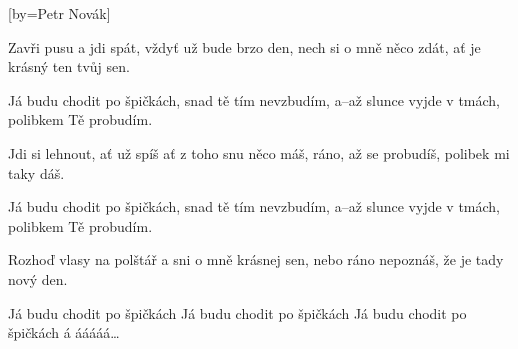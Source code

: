 [by={Petr Novák}]

\beginverse{}
Zavři pusu a jdi spát, vždyť už bude brzo den,
nech si o mně něco zdát, ať je krásný ten tvůj sen.
\endverse{}

\beginchorus{}
Já budu chodit po špičkách, snad tě tím nevzbudím,
a--až slunce vyjde v tmách, polibkem Tě probudím.
\endchorus{}

\beginverse{}
Jdi si lehnout, ať už spíš ať z toho snu něco máš,
ráno, až se probudíš, polibek mi taky dáš.
\endverse{}

\beginchorus{}
Já budu chodit po špičkách, snad tě tím nevzbudím,
a--až slunce vyjde v tmách, polibkem Tě probudím.
\endchorus{}

\beginverse{}
Rozhoď vlasy na polštář a sni o mně krásnej sen,
nebo ráno nepoznáš, že je tady nový den.
\endverse{}

\beginchorus{}
Já budu chodit po špičkách
Já budu chodit po špičkách
Já budu chodit po špičkách
á ááááá\ldots{}  
\endchorus{}

\endsong{}
